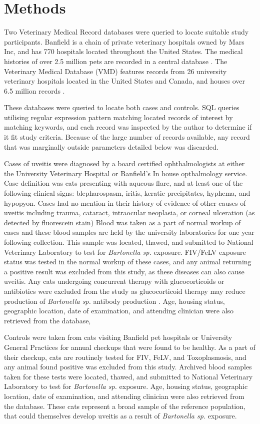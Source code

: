 \documentclass[11pt,twocolumn]{article}
\begin{document}
\section{Methods}
	Two Veterinary Medical Record databases were queried to locate suitable study participants.
	Banfield is a chain of private veterinary hospitals owned by Mars Inc, and has 770 hospitals located throughout the United States.
	The medical histories of over 2.5 million pets are recorded in a central database \cite{bark12}.
	The Veterinary Medical Database (VMD) features records from 26 university veterinary hospitals located in the United States and Canada, and houses over 6.5 million records \cite{UniversityVeterinary}.
	

	These databases were queried to locate both cases and controls. SQL queries utilising regular expression pattern matching located records of interest by matching keywords, and each record was inspected by the author to determine if it fit study criteria. Because of the large number of records available, any record that was marginally outside parameters detailed below was discarded.


	Cases of uveitis were diagnosed by a board certified ophthalmologists at either the University Veterinary Hospital or Banfield's In house opthalmology service.
	Case definition was cats presenting with aqueous flare, and at least one of the following clinical signs: blepharospasm, iritis, keratic precipitates, hyphema, and hypopyon. 
	Cases had no mention in their history of evidence of other causes of uveitis including trauma, cataract, intraocular neoplasia, or corneal ulceration (as detected by fluorescein stain) 
	Blood was taken as a part of normal workup of cases and these blood samples are held by the university laboratories for one year following collection. This sample was located, thawed, and submitted to National Veterinary Laboratory to test for \emph{Bartonella sp.} exposure.
	FIV/FeLV exposure status was tested in the normal workup of these cases, and any animal returning a positive result was excluded from this study, as these diseases can also cause uveitis. 
	Any cats undergoing concurrent therapy with glucocorticoids or antibiotics were excluded from the study as glucocorticoid therapy may reduce production of \emph{Bartonella sp.} antibody production \cite{Lappin2000}.
	Age, housing status, geographic location, date of examination, and attending clinician  were also retrieved from the database, 



	Controls were taken from cats visiting Banfield pet hospitals or University General Practices for annual checkups that were found to be healthy. 
	As a part of their checkup, cats are routinely tested for FIV, FeLV, and Toxoplasmosis, and any animal found positive was excluded from this study. 
	Archived blood samples taken for these tests were located, thawed, and submitted to National Veterinary Laboratory to test for \emph{Bartonella sp.} exposure.
	Age, housing status, geographic location, date of examination, and attending clinician  were also retrieved from the database. 
	These cats represent a broad sample of the reference population, that could themselves develop uveitis as a result of \emph{Bartonella sp.} exposure.
\end{document}
